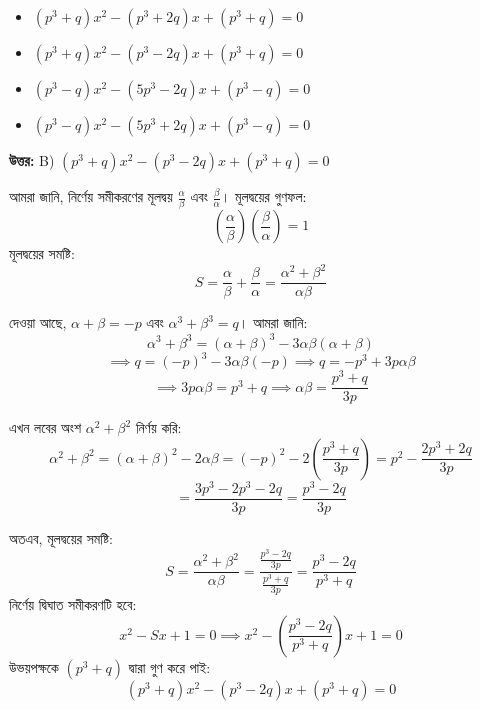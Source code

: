 \documentclass[12pt, a4paper]{article}
\begin{document}
\begin{itemize}[label={}, leftmargin=1cm, itemsep=0.5em]
    \item[\textbf{A)}] $(p^3+q)x^2 - (p^3+2q)x + (p^3+q) = 0$
    \item[\textbf{B)}] $(p^3+q)x^2 - (p^3-2q)x + (p^3+q) = 0$
    \item[\textbf{C)}] $(p^3-q)x^2 - (5p^3-2q)x + (p^3-q) = 0$
    \item[\textbf{D)}] $(p^3-q)x^2 - (5p^3+2q)x + (p^3-q) = 0$
\end{itemize}

\vspace{0.5em}
\begin{tcolorbox}[answerbox]
    \textbf{\color{success} উত্তর:} B) $(p^3+q)x^2 - (p^3-2q)x + (p^3+q) = 0$
\end{tcolorbox}
\vspace{1em}

\begin{tcolorbox}[solutionbox={সমাধান (Solution)}]
    \noindent
    আমরা জানি, নির্ণেয় সমীকরণের মূলদ্বয় $\frac{\alpha}{\beta}$ এবং $\frac{\beta}{\alpha}$।
    মূলদ্বয়ের গুণফল:
    \[ \left(\frac{\alpha}{\beta}\right) \left(\frac{\beta}{\alpha}\right) = 1 \]
    মূলদ্বয়ের সমষ্টি:
    \[ S = \frac{\alpha}{\beta} + \frac{\beta}{\alpha} = \frac{\alpha^2+\beta^2}{\alpha\beta} \]
    
    \vspace{0.5em}
    দেওয়া আছে, $\alpha+\beta = -p$ এবং $\alpha^3+\beta^3 = q$। আমরা জানি:
    \[ \alpha^3+\beta^3 = (\alpha+\beta)^3 - 3\alpha\beta(\alpha+\beta) \]
    \[ \implies q = (-p)^3 - 3\alpha\beta(-p) \implies q = -p^3 + 3p\alpha\beta \]
    \[ \implies 3p\alpha\beta = p^3 + q \implies \alpha\beta = \frac{p^3+q}{3p} \]
    
    \vspace{0.5em}
    এখন লবের অংশ $\alpha^2+\beta^2$ নির্ণয় করি:
    \[ \alpha^2+\beta^2 = (\alpha+\beta)^2 - 2\alpha\beta = (-p)^2 - 2\left(\frac{p^3+q}{3p}\right) = p^2 - \frac{2p^3+2q}{3p} \]
    \[ = \frac{3p^3 - 2p^3 - 2q}{3p} = \frac{p^3-2q}{3p} \]
    
    \vspace{0.5em}
    অতএব, মূলদ্বয়ের সমষ্টি:
    \[ S = \frac{\alpha^2+\beta^2}{\alpha\beta} = \frac{\frac{p^3-2q}{3p}}{\frac{p^3+q}{3p}} = \frac{p^3-2q}{p^3+q} \]
    নির্ণেয় দ্বিঘাত সমীকরণটি হবে:
    \[ x^2 - Sx + 1 = 0 \implies x^2 - \left(\frac{p^3-2q}{p^3+q}\right)x + 1 = 0 \]
    উভয়পক্ষকে $(p^3+q)$ দ্বারা গুণ করে পাই:
    \[ (p^3+q)x^2 - (p^3-2q)x + (p^3+q) = 0 \]
\end{tcolorbox}
\vspace{1em}
\end{document}
